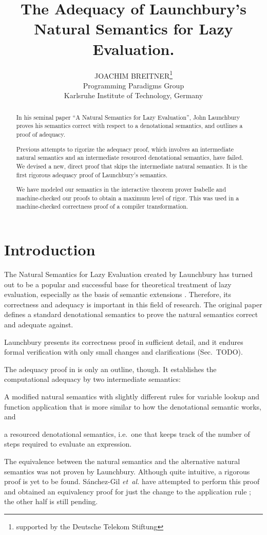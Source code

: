 \documentclass{jfp1}
\title[The Adequacy of Launchbury's Semantics]
      {The Adequacy of Launchbury's\\ Natural Semantics for Lazy Evaluation.}
\author[J. Breitner]
        {JOACHIM BREITNER\thanks{supported by the Deutsche Telekom Stiftung}\\
	Programming Paradigms Group\\
         Karlsruhe Institute of Technology, Germany\\
         \email{breitner@kit.edu}}
\theoremstyle{nonumberbreak}
\begin{document}
\label{firstpage}

\maketitle

\begin{abstract}
In his seminal paper “A Natural Semantics for Lazy Evaluation”, John Launchbury
proves his semantics correct with respect to a denotational semantics, and outlines a proof of adequacy.

Previous attempts to rigorize the adequacy proof, which involves an intermediate natural semantics and an intermediate resourced denotational semantics, have failed. We devised a new, direct proof that skips the intermediate natural semantics. It is the first rigorous adequacy proof of Launchbury’s semantics.

We have modeled our semantics in the interactive theorem prover Isabelle and machine-checked our proofs to obtain a maximum level of rigor. This was used in a machine-checked correctness proof of a compiler transformation.
\end{abstract}


\section{Introduction}

The Natural Semantics for Lazy Evaluation created by Launchbury  has turned out to be a popular and successful base for theoretical treatment of lazy evaluation, especially as the basis of semantic extensions \cite{nakata, nakata_blackhole, distributed, mixed, parallel}. Therefore, its correctness and adequacy is important in this field of research. The original paper defines a standard denotational semantics to prove the natural semantics correct and adequate against.

Launchbury presents its correctness proof in sufficient detail, and it endures formal verification with only small changes and clarifications (Sec.~TODO).

The adequacy proof in \cite{launchbury} is only an outline, though. It establishes the computational adequacy by two intermediate semantics:
\begin{compactitem}
\item A modified natural semantics with slightly different rules for variable lookup and function application that is more similar to how the denotational semantic works, and
\item a resourced denotational semantics, i.e.~one that keeps track of the number of steps required to evaluate an expression.
\end{compactitem}
The equivalence between the natural semantics and the alternative natural semantics was not proven by Launchbury. Although quite intuitive, a rigorous proof is yet to be found. S{\'a}nchez-Gil {\em et~al.} have attempted to perform this proof and obtained an equivalency proof for just the change to the application rule ; the other half is still pending.
\end{document}
